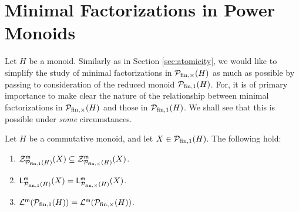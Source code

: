 \section{Minimal Factorizations in Power Monoids}
\label{subsec:min-factorization-in-PMs}
%
Let $H$ be a monoid. Similarly as in Section \ref{sec:atomicity}, we would like to simplify the study of minimal factorizations in $\mathcal{P}_{\textrm{fin}, \times}(H)$ as much as possible by passing to consideration of the reduced monoid $\mathcal{P}_{\textrm{fin}, 1}(H)$. For, it is of primary importance to make clear the nature of the relationship between minimal factorizations in $\mathcal{P}_{\textrm{fin}, \times}(H)$ and those in $\mathcal{P}_{\textrm{fin}, 1}(H)$.
We shall see that this is possible under \emph{some} circumstances. 
%
\begin{prop}\label{prop:comm-pm}
	Let $H$ be a commutative monoid, and let $X\in \mathcal{P}_{\textrm{fin},1}(H)$. The following hold:
	\begin{enumerate}[label = {\rm (\roman{*})}]
		\item\label{it:prop:comm-pm(i)} $\mathcal{Z}_{\mathcal{P}_{\textrm{fin},1}(H)}^{\mathsf{m}}(X) \subseteq \mathcal{Z}_{\mathcal{P}_{{\textrm{fin}, \times}}(H)}^{\mathsf{m}}(X)$.
		\item\label{it:prop:comm-pm(ii)} $\mathsf{L}_{\mathcal{P}_{\textrm{fin},1}(H)}^{\mathsf{m}}(X) = \mathsf{L}_{\mathcal{P}_{\textrm{fin}, \times}(H)}^{\mathsf{m}}(X)$.
		\item\label{it:prop:comm-pm(iii)} $\mathcal{L}^{\mathsf{m}}(\mathcal{P}_{\textrm{fin},1}(H)) = \mathcal{L}^{\mathsf{m}}(\mathcal{P}_{\textrm{fin}, \times}(H))$.
	\end{enumerate}
\end{prop}
%
